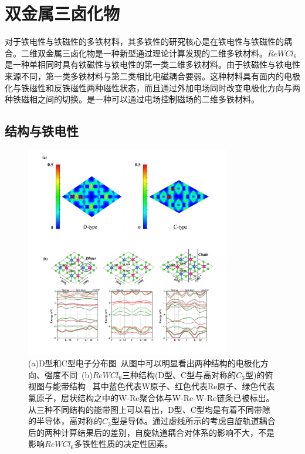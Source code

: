 \section{双金属三卤化物}
对于铁电性与铁磁性的多铁材料，其多铁性的研究核心是在铁电性与铁磁性的耦合。二维双金属三卤化物是一种新型通过理论计算发现的二维多铁材料。$ReWCl_{6}$是一种单相同时具有铁磁性与铁电性的第一类二维多铁材料。\cite{xu2020electrical}由于铁磁性与铁电性来源不同，第一类多铁材料与第二类相比电磁耦合要弱。这种材料具有面内的电极化与铁磁性和反铁磁性两种磁性状态，而且通过外加电场同时改变电极化方向与两种铁磁相之间的切换。是一种可以通过电场控制磁场的二维多铁材料。

\subsection{结构与铁电性}

\begin{figure}[h]
    \centering
\includegraphics[width=0.8\textwidth]{./pic/021.png}
\caption{(a)D型和C型电子分布图\ 从图中可以明显看出两种结构的电极化方向、强度不同\ (b)$ReWCl_{6}$三种结构(D型、C型与高对称的$C_{3}$型)的俯视图与能带结构 \ 其中蓝色代表W原子、红色代表Re原子、绿色代表氯原子，层状结构之中的W-Re聚合体与W-Re-W-Re链条已被标出。从三种不同结构的能带图上可以看出，D型、C型均是有着不同带隙的半导体，高对称的$C_{3}$型是导体。通过虚线所示的考虑自旋轨道耦合后的两种计算结果后的差别，自旋轨道耦合对体系的影响不大，不是影响$ReWCl_{6}$多铁性性质的决定性因素。}

\label{dog021}
\end{figure}

